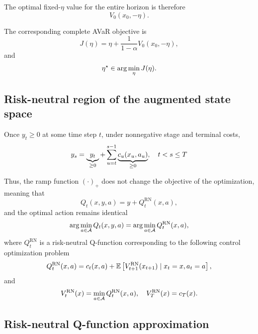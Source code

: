 The optimal fixed-$\eta$ value for the entire horizon is therefore
\begin{equation}
	V_0(x_0,-\eta).
	\label{root-value}
\end{equation}

The corresponding complete AVaR objective is
\begin{equation}
	J(\eta) = \eta + \frac{1}{1-\alpha} V_0(x_0,-\eta),
	\label{root-avar}
\end{equation}
and
\begin{equation}
	\eta^\star \in \arg\min_{\eta} J(\eta).
	\notag
	\label{optimal-eta}
\end{equation}

\subsection{Risk-neutral region of the augmented state space}
\label{problem:rn-region}

Once $y_t \geq 0$ at some time step $t$, under nonnegative stage and terminal costs,
\begin{equation}
	y_s = \underbrace{y_t}_{\geq 0} + \sum_{u=t}^{s-1} \underbrace{c_u(x_u, a_u)}_{\geq 0}, \quad t < s \leq T
	\notag
	\label{positive-augmented}
\end{equation}

Thus, the ramp function $(\cdot)_+$ does not change the objective of the optimization, meaning that
\begin{equation}
	Q_t(x, y, a) = y + Q_t^{\text{RN}}(x, a),
	\label{q-func-using-rn}
\end{equation}
and the optimal action remains identical
\begin{equation}
	\arg\min_{a \in \mathcal{A}} Q_t(x, y, a) = \arg\min_{a \in \mathcal{A}} Q_t^{\text{RN}}(x, a),
	\label{q-func-rn-argmin}
\end{equation}
where $Q_t^{\text{RN}}$ is a risk-neutral Q-function corresponding to the following control optimization problem
\begin{equation}
	Q_t^{\text{RN}}(x, a) = c_t(x, a) + \mathbb{E} \left[ V_{t+1}^{\text{RN}} (x_{t+1}) \mid x_t = x, a_t = a \right],
	\label{q-rn-bellman}
\end{equation}
and
\begin{equation}
	V_t^{\text{RN}}(x) = \min_{a \in \mathcal{A}} Q_t^{\text{RN}}(x, a), \quad V_T^{\text{RN}}(x) = c_T(x).
	\label{value-rn}
\end{equation}

\subsection{Risk-neutral Q-function approximation}
\label{problem:rn-approximation}

